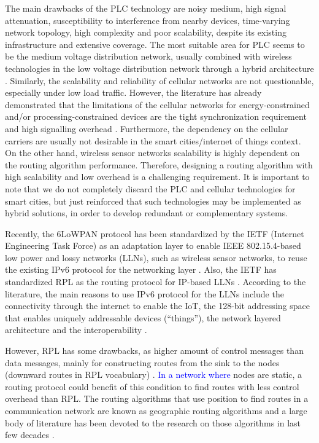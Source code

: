 \documentclass[final,authoryear,3p,twocolumn]{elsarticle}
\newcommand{\rev}{\textcolor{blue}}
\begin{document}
The main drawbacks of the PLC technology are noisy medium, high signal attenuation, susceptibility to interference from nearby devices, time-varying network topology, high complexity and poor scalability, despite its existing infrastructure and extensive coverage. The most suitable area for PLC seems to be the medium voltage distribution network, usually combined with wireless technologies in the low voltage distribution network through a hybrid architecture \citep{PLC_drawbacks}. Similarly, the scalability and reliability of cellular networks are not questionable, especially under low load traffic. However, the literature has already demonstrated that the limitations of the cellular networks for energy-constrained and/or processing-constrained devices are the tight synchronization requirement and high signalling overhead \citep{celullar_iot}. Furthermore, the dependency on the cellular carriers are usually not desirable in the smart cities/internet of things context. On the other hand, wireless sensor networks scalability is highly dependent on the routing algorithm performance. Therefore, designing a routing algorithm with high scalability and low overhead is a challenging requirement. It is important to note that we do not completely discard the PLC and cellular technologies for smart cities, but just reinforced that such technologies may be implemented as hybrid solutions, in order to develop redundant or complementary systems.

Recently, the 6LoWPAN protocol has been standardized by the IETF (Internet Engineering Task Force) as an adaptation layer to enable IEEE 802.15.4-based low power and lossy networks (LLNs), such as wireless sensor networks, to reuse the existing IPv6 protocol for the networking layer \citep{RFC4944}. Also, the IETF has standardized RPL as the routing protocol for IP-based LLNs \citep{RFC6550}. According to the literature, the main reasons to use IPv6 protocol for the LLNs include the connectivity through the internet to enable the IoT, the 128-bit addressing space that enables uniquely addressable devices (``things''), the network layered architecture and the interoperability \citep{IPv6_LLN_2010, Smart_City_IOT_2014b}.

However, RPL has some drawbacks, as higher amount of control messages than data messages, mainly for constructing routes from the sink to the nodes (downward routes in RPL vocabulary) \citep{Heurtefeux_RPL_2013,P2P_analysis_2010,P2P-RPL_2011}. \rev{In a network where} nodes are static, a routing protocol could benefit of this condition to find routes with less control overhead than RPL. The routing algorithms that use position to find routes in a communication network are known as geographic routing algorithms and a large body of literature has been devoted to the research on those algorithms in last few decades \citep{Karp_GPSR_2000, GOAFR_2008, Denardin2011}.
\end{document}
